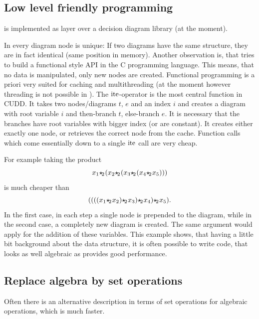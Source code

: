 \subsection{Low level friendly programming}
\label{low-level-friendly}
\PolyBoRi is implemented as layer over a decision diagram library (\CUDD at the moment).

In \CUDD every diagram node is unique: If two diagrams have the same structure, they are in fact identical (same position in memory).
Another observation is, that \CUDD tries to build a functional style API in the C programming language. This means, that no data is manipulated, only new nodes are created.
Functional programming is a priori very suited for caching and multithreading (at the moment however threading is not possible in \PolyBoRi).
The $\operatorname{ite}$-operator is the most central function in CUDD. It takes two nodes/diagrams $t$, $e$ and an index $i$ and creates a diagram with root variable $i$ and
then-branch $t$, else-branch $e$. It is necessary that the branches have root variables with bigger index (or are constant).
It creates either exactly one node, or retrieves the correct node from the cache.
Function calls which come essentially down to a single $\operatorname{ite}$ call are very cheap.

For example taking the product \[
    x_1 {\star\hspace{-.15em}_2\hspace{.05em}} (x_2{\star\hspace{-.15em}_2\hspace{.05em}}(x_3{\star\hspace{-.15em}_2\hspace{.05em}} (x_4{\star\hspace{-.15em}_2\hspace{.05em}} x_5)))
\] is much cheaper than \[
    ((((x_1 {\star\hspace{-.15em}_2\hspace{.05em}} x_2){\star\hspace{-.15em}_2\hspace{.05em}} x_3){\star\hspace{-.15em}_2\hspace{.05em}} x_4){\star\hspace{-.15em}_2\hspace{.05em}} x_5).
\]
In the first case, in each step a single node is prepended to the diagram, while in the second case, a completely new diagram is created.
The same argument would apply for the addition of these variables.
This example shows, that having a little bit background about the data structure, it is often possible to write code, that looks as well algebraic as provides good performance.

\subsection{Replace algebra by set operations}
Often there is an alternative description in terms of set operations for algebraic operations, which is much faster.

